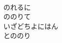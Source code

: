 \documentclass[10pt,b5j]{tarticle} %
\begin{document}
\begin{enumerate}
\begin{minipage}[c]{\blocksize}
    \end{minipage}
    \begin{minipage}[c]{\blocksize}
        
        \vspace{\linespace}
        \item~\\
        のれるに\\
        ののりて\\
        いざどちよにはん\\
        とののり
    
    \end{minipage}
\end{enumerate} %
\end{document}
